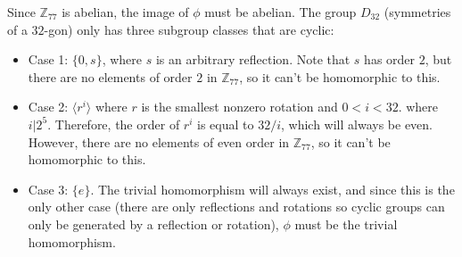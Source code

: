 \begin{sol}
    Since $\mathbb{Z}_{77}$ is abelian, the image of $\phi$ must be abelian. The group $D_{32}$ (symmetries of a $32$-gon) only has three subgroup classes that are cyclic:
    \begin{itemize}
        \item Case 1: $\{0,s\}$, where $s$ is an arbitrary reflection. Note that $s$ has order $2$, but there are no elements of order $2$ in $\mathbb{Z}_{77}$, so it can't be homomorphic to this.
        \item Case 2: $\langle r^i \rangle$ where $r$ is the smallest nonzero rotation and $0 < i < 32.$ where $i | 2^5$. Therefore, the order of $r^i$ is equal to $32/i$, which will always be even. However, there are no elements of even order in $\mathbb{Z}_{77}$, so it can't be homomorphic to this.
        \item Case 3: $\{e\}$. The trivial homomorphism will always exist, and since this is the only other case (there are only reflections and rotations so cyclic groups can only be generated by a reflection or rotation), $\phi$ must be the trivial homomorphism.
    \end{itemize}
\end{sol}